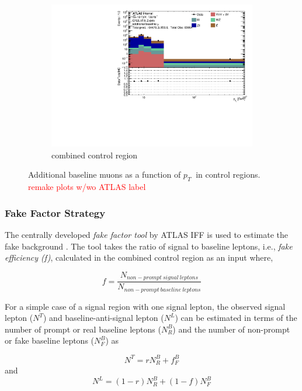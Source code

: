 \begin{figure}[htb]
    \begin{subfigure}{.48\textwidth}
        \centering
        \includegraphics[width=.9\linewidth]{figures/Analysis/Background/Overlay_pt_Baseline_muons_Combined.pdf}
        \caption{combined control region}
    \end{subfigure}
        \caption{ Additional baseline muons as a function of $p_{T}~$ in control regions. \textcolor{red}{remake plots w/wo ATLAS label} \label{fig:ControlRegionsAdditionalBaselineMuonpT}}
\end{figure}

\subsubsection{ Fake Factor Strategy }
\label{subsubsec:EstimationStrategy}

The centrally developed \textit{fake factor tool} by ATLAS IFF is used to estimate the fake background \cite{FakeBkgTool}. The tool takes the ratio of signal to baseline leptons, i.e., \textit{fake efficiency (f)}, calculated in the combined control region as an input where,

\begin{equation}
f = \frac{N_{non-prompt~signal~leptons}}{N_{non-prompt~baseline~leptons}}
\end{equation}

For a simple case of a signal region with one signal lepton, the observed signal lepton ($N^{T}$) and baseline-anti-signal lepton ($N^{L}$) can be estimated in terms of the number of prompt or real baseline leptons ($N^{B}_{R}$) and the number of non-prompt or fake baseline leptons ($N^{B}_{F}$) as

\begin{equation}
N^{T} = rN^{B}_{R}+f^{B}_{F}
\label{eqn:NoOfTight}
\end{equation}
and 
\begin{equation}
N^{L} = (1-r)N^{B}_{R} + (1-f)N^{B}_{F}
\label{eqn:NoOfLoose}
\end{equation}

